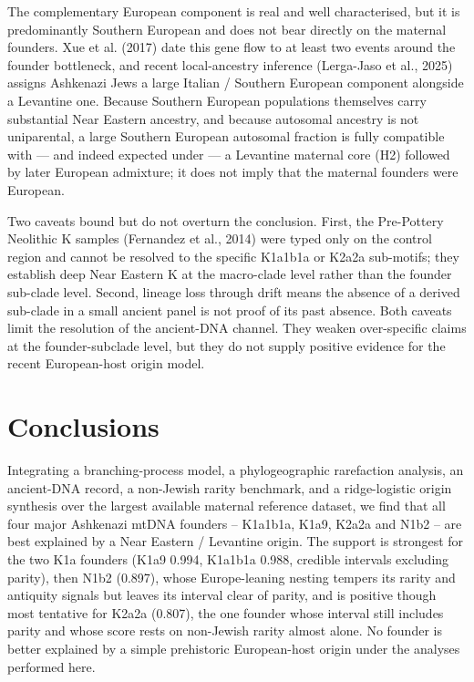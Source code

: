 \documentclass[11pt]{article}
\begin{document}
The complementary European component is real and well characterised, but it is predominantly Southern European and does not bear directly on the maternal founders. Xue et al. (2017) date this gene flow to at least two events around the founder bottleneck, and recent local-ancestry inference (Lerga-Jaso et al., 2025) assigns Ashkenazi Jews a large Italian / Southern European component alongside a Levantine one. Because Southern European populations themselves carry substantial Near Eastern ancestry, and because autosomal ancestry is not uniparental, a large Southern European autosomal fraction is fully compatible with --- and indeed expected under --- a Levantine maternal core (H2) followed by later European admixture; it does not imply that the maternal founders were European.

Two caveats bound but do not overturn the conclusion. First, the Pre-Pottery Neolithic K samples (Fernandez et al., 2014) were typed only on the control region and cannot be resolved to the specific K1a1b1a or K2a2a sub-motifs; they establish deep Near Eastern K at the macro-clade level rather than the founder sub-clade level. Second, lineage loss through drift means the absence of a derived sub-clade in a small ancient panel is not proof of its past absence. Both caveats limit the resolution of the ancient-DNA channel. They weaken over-specific claims at the founder-subclade level, but they do not supply positive evidence for the recent European-host origin model.

\section{Conclusions}
Integrating a branching-process model, a phylogeographic rarefaction analysis, an ancient-DNA record, a non-Jewish rarity benchmark, and a ridge-logistic origin synthesis over the largest available maternal reference dataset, we find that all four major Ashkenazi mtDNA founders -- K1a1b1a, K1a9, K2a2a and N1b2 -- are best explained by a Near Eastern / Levantine origin. The support is strongest for the two K1a founders (K1a9 0.994, K1a1b1a 0.988, credible intervals excluding parity), then N1b2 (0.897), whose Europe-leaning nesting tempers its rarity and antiquity signals but leaves its interval clear of parity, and is positive though most tentative for K2a2a (0.807), the one founder whose interval still includes parity and whose score rests on non-Jewish rarity almost alone. No founder is better explained by a simple prehistoric European-host origin under the analyses performed here.
\end{document}
